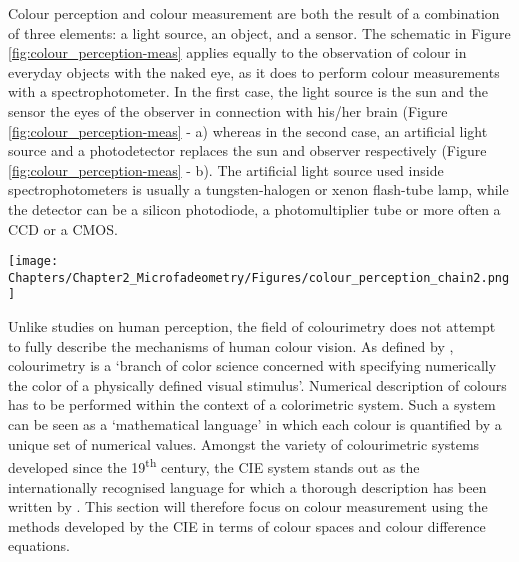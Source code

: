 Colour perception and colour measurement are both the result of a combination of three elements: a light source, an object, and a sensor. The schematic in Figure \ref{fig:colour_perception-meas} applies equally to the observation of colour in everyday objects with the naked eye, as it does to perform colour measurements with a spectrophotometer. In the first case, the light source is the sun and the sensor the eyes of the observer in connection with his/her brain (Figure \ref{fig:colour_perception-meas} - a) whereas in the second case, an artificial light source and a photodetector replaces the sun and observer respectively (Figure \ref{fig:colour_perception-meas} - b). The artificial light source used inside spectrophotometers is usually a tungsten-halogen or xenon flash-tube lamp, while the detector can be a silicon photodiode, a photomultiplier tube or more often a \gls{CCD} or a \gls{CMOS}.

\begin{figure*}
\centering
\texttt{[image: Chapters/Chapter2\_Microfadeometry/Figures/colour\_perception\_chain2.png]}
\caption[\hspace{0.3cm}Colour perception and colour measurements]{(a) Colour perception and (b) colour measurement processes (adapted from \url{https://freerangestock.com/}).}
\label{fig:colour_perception-meas}
\end{figure*}

Unlike studies on human perception, the field of colourimetry does not attempt to fully describe the mechanisms of human colour vision. As defined by \citet{wyszecki_color_1982}, colourimetry is a ‘branch of color science concerned with specifying numerically the color of a physically defined visual stimulus’. Numerical description of colours has to be performed within the context of a colorimetric system. Such a system can be seen as a ‘mathematical language’ in which each colour is quantified by a unique set of numerical values. Amongst the variety of colourimetric systems developed since the 19\textsuperscript{th} century, the \gls{CIE} system stands out as the internationally recognised language for which a thorough description has been written by \citet{schanda_colorimetry_2007}. This section will therefore focus on colour measurement using the methods developed by the \gls{CIE} in terms of colour spaces and colour difference equations.\\

